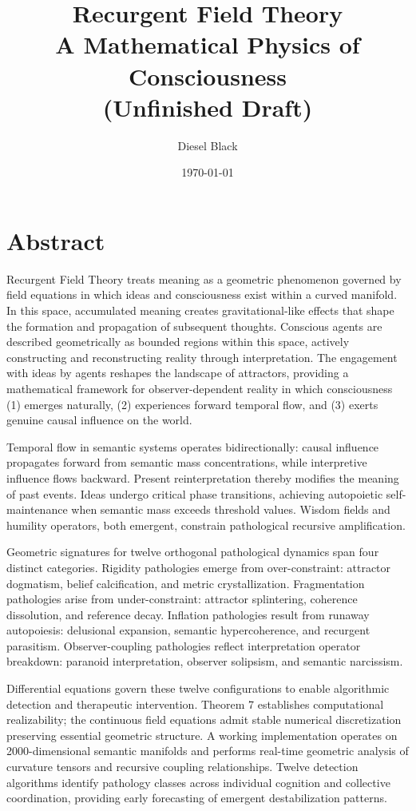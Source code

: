 \documentclass[11pt, a4paper]{report}
\title{Recurgent Field Theory \\ A Mathematical Physics of Consciousness \\ \small{(Unfinished Draft)}}
\author{Diesel Black}
\date{\today}
\begin{document}
\maketitle

\section*{Abstract}
Recurgent Field Theory treats meaning as a geometric phenomenon governed by field equations in which ideas and consciousness exist within a curved manifold. In this space, accumulated meaning creates gravitational-like effects that shape the formation and propagation of subsequent thoughts. Conscious agents are described geometrically as bounded regions within this space, actively constructing and reconstructing reality through interpretation. The engagement with ideas by agents reshapes the landscape of attractors, providing a mathematical framework for observer-dependent reality in which consciousness (1) emerges naturally, (2) experiences forward temporal flow, and (3) exerts genuine causal influence on the world.

Temporal flow in semantic systems operates bidirectionally: causal influence propagates forward from semantic mass concentrations, while interpretive influence flows backward. Present reinterpretation thereby modifies the meaning of past events. Ideas undergo critical phase transitions, achieving autopoietic self-maintenance when semantic mass exceeds threshold values. Wisdom fields and humility operators, both emergent, constrain pathological recursive amplification.

Geometric signatures for twelve orthogonal pathological dynamics span four distinct categories. Rigidity pathologies emerge from over-constraint: attractor dogmatism, belief calcification, and metric crystallization. Fragmentation pathologies arise from under-constraint: attractor splintering, coherence dissolution, and reference decay. Inflation pathologies result from runaway autopoiesis: delusional expansion, semantic hypercoherence, and recurgent parasitism. Observer-coupling pathologies reflect interpretation operator breakdown: paranoid interpretation, observer solipsism, and semantic narcissism.

Differential equations govern these twelve configurations to enable algorithmic detection and therapeutic intervention. Theorem 7 establishes computational realizability; the continuous field equations admit stable numerical discretization preserving essential geometric structure. A working implementation operates on 2000-dimensional semantic manifolds and performs real-time geometric analysis of curvature tensors and recursive coupling relationships. Twelve detection algorithms identify pathology classes across individual cognition and collective coordination, providing early forecasting of emergent destabilization patterns.
\end{document}
